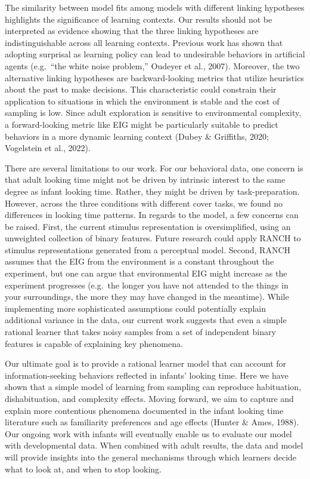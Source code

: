 \documentclass[
  man,floatsintext]{apa6}
\begin{document}
The similarity between model fits among models with different linking hypotheses highlights the significance of learning contexts. Our results should not be interpreted as evidence showing that the three linking hypotheses are indistinguishable across all learning contexts. Previous work has shown that adopting surprisal as learning policy can lead to undesirable behaviors in artificial agents (e.g.~``the white noise problem,'' Oudeyer et al., 2007). Moreover, the two alternative linking hypotheses are backward-looking metrics that utilize heuristics about the past to make decisions. This characteristic could constrain their application to situations in which the environment is stable and the cost of sampling is low. Since adult exploration is sensitive to environmental complexity, a forward-looking metric like EIG might be particularly suitable to predict behaviors in a more dynamic learning context (Dubey \& Griffiths, 2020; Vogelstein et al., 2022).

There are several limitations to our work. For our behavioral data, one concern is that adult looking time might not be driven by intrinsic interest to the same degree as infant looking time. Rather, they might be driven by task-preparation. However, across the three conditions with different cover tasks, we found no differences in looking time patterns. In regards to the model, a few concerns can be raised. First, the current stimulus representation is oversimplified, using an unweighted collection of binary features. Future research could apply RANCH to stimulus representations generated from a perceptual model. Second, RANCH assumes that the EIG from the environment is a constant throughout the experiment, but one can argue that environmental EIG might increase as the experiment progresses (e.g.~the longer you have not attended to the things in your surroundings, the more they may have changed in the meantime). While implementing more sophisticated assumptions could potentially explain additional variance in the data, our current work suggests that even a simple rational learner that takes noisy samples from a set of independent binary features is capable of explaining key phenomena.

Our ultimate goal is to provide a rational learner model that can account for information-seeking behaviors reflected in infants' looking time. Here we have shown that a simple model of learning from sampling can reproduce habituation, dishabituation, and complexity effects. Moving forward, we aim to capture and explain more contentious phenomena documented in the infant looking time literature such as familiarity preferences and age effects (Hunter \& Ames, 1988). Our ongoing work with infants will eventually enable us to evaluate our model with developmental data. When combined with adult results, the data and model will provide insights into the general mechanisms through which learners decide what to look at, and when to stop looking.
\end{document}
